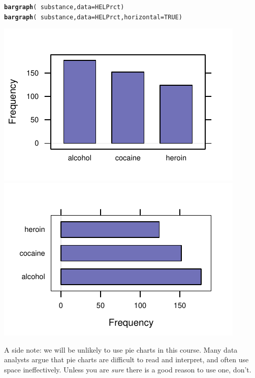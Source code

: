\documentclass[twoside]{book}\usepackage[]{graphicx}\usepackage[]{xcolor}
\makeatletter
\def\maxwidth{ %
  \ifdim\Gin@nat@width>\linewidth
    \linewidth
  \else
    \Gin@nat@width
  \fi
}
\newcommand{\hlnum}[1]{\textcolor[rgb]{0.686,0.059,0.569}{#1}}%
\newcommand{\hlopt}[1]{\textcolor[rgb]{0,0,0}{#1}}%
\newcommand{\hlstd}[1]{\textcolor[rgb]{0.345,0.345,0.345}{#1}}%
\newcommand{\hlkwc}[1]{\textcolor[rgb]{0.333,0.667,0.333}{#1}}%
\newcommand{\hlkwd}[1]{\textcolor[rgb]{0.737,0.353,0.396}{\textbf{#1}}}%
\newenvironment{kframe}{%
 \def\at@end@of@kframe{}%
 \ifinner\ifhmode%
  \def\at@end@of@kframe{\end{minipage}}%
  \begin{minipage}{\columnwidth}%
 \fi\fi%
 \def\FrameCommand##1{\hskip\@totalleftmargin \hskip-\fboxsep
 \colorbox{shadecolor}{##1}\hskip-\fboxsep
     \hskip-\linewidth \hskip-\@totalleftmargin \hskip\columnwidth}%
 \MakeFramed {\advance\hsize-\width
   \@totalleftmargin\z@ \linewidth\hsize
   \@setminipage}}%
 {\par\unskip\endMakeFramed%
 \at@end@of@kframe}
\newenvironment{knitrout}{}{} %
\makeatother
\begin{document}
\begin{knitrout}
\color{fgcolor}\begin{kframe}
\begin{alltt}
\hlkwd{bargraph}\hlstd{(}\hlopt{~}\hlstd{substance,} \hlkwc{data} \hlstd{= HELPrct)}
\hlkwd{bargraph}\hlstd{(}\hlopt{~}\hlstd{substance,} \hlkwc{data} \hlstd{= HELPrct,} \hlkwc{horizontal} \hlstd{=} \hlnum{TRUE}\hlstd{)}
\end{alltt}
\end{kframe}

{\centering \includegraphics[width=\maxwidth]{figures/fig-bargraph-1} 
\includegraphics[width=\maxwidth]{figures/fig-bargraph-2} 

}



\end{knitrout}

A side note: we will be unlikely to use pie charts in this course.
Many data analysts argue that pie charts are difficult to read and interpret,
and often use space ineffectively.  Unless you are \textit{sure} 
there is a good reason to use one, don't.
\end{document}
